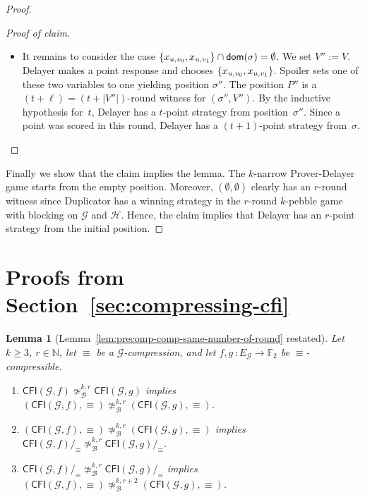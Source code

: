 \documentclass[10pt,a4paper]{article}
\DeclarePairedDelimiter\set{\lbrace}{\rbrace}
\newcommand{\comp}{\equiv}
\newcommand{\CFIsym}{\mathsf{CFI}}
\newcommand{\CFI}[1]{\CFIsym(#1)}
\newcommand{\compCFI}[2]{\CFI{#1}/_{#2}}
\newcommand{\precompCFI}[2]{{(\CFI{#1},#2)}}
\newcommand{\nat}{\mathbb{N}}
\newcommand{\FF}{\mathbb{F}}
\newcommand{\graphG}{\mathcal{G}}
\newcommand{\graphH}{\mathcal{H}}
\newcommand{\edgeG}{E_{\graphG}}
\newcommand{\dom}{\mathsf{dom}}
\newcommand{\notkbequivr}[2]{\not\simeq_{\mathcal{B}}^{#1,#2}}
\newtheorem{lemma}[theorem]{Lemma}
\newenvironment{claimproof}{\begin{proof}[Proof of claim]}{\end{proof}}
\newcommand{\claimqedhere}{\qedhere}
\begin{document}
\begin{proof}
\begin{claimproof}
\begin{itemize}
        Hence, we may assume that this case does not occur.
        \item It remains to consider the case $\set{x_{u,v_0}, x_{u,v_1}} \cap \dom(\sigma) = \emptyset$.
        We set $V'' := V$.
        Delayer makes a point response and chooses $\set{x_{u,v_0}, x_{u,v_1}}$.
        Spoiler sets one of these two variables to one yielding position $\sigma''$.
        The position $P''$ is a $(t+\ell)=(t+|V''|)$-round witness for $(\sigma'',V'')$.
        By the inductive hypothesis for~$t$,
        Delayer has a $t$\nobreakdash-point strategy from position~$\sigma''$.
        Since a point was scored in this round,
        Delayer has a $(t+1)$\nobreakdash-point strategy from~$\sigma$. 
    	\claimqedhere
\end{itemize}
\end{claimproof}


Finally we show that the claim implies the lemma. The $k$-narrow Prover-Delayer game starts from the empty position. Moreover, $(\emptyset,\emptyset)$ clearly has an $r$-round witness since Duplicator has a winning strategy in the $r$-round $k$-pebble game with blocking on $\graphG$ and $\graphH$. Hence, the claim implies that Delayer has an $r$-point strategy from the initial position.
\end{proof} 
\section{Proofs from Section~\ref{sec:compressing-cfi}} \label{a: compress}

\begin{lemma}[Lemma~\ref{lem:precomp-comp-same-number-of-round} restated]
        Let $k\geq 3$, $r\in\nat$, let $\comp$ be a $\graphG$-compression, and
        let $f,g \, \colon \edgeG \to \FF_2$ be $\comp$\nobreakdash-compressible.
        \begin{enumerate}
                \item $\CFI{\graphG,f} \notkbequivr{k}{r} \CFI{\graphG,g}$
                implies $\precompCFI{\graphG,f}{\comp} \notkbequivr{k}{r} \precompCFI{\graphG,g}{\comp}$.
                \item  $\precompCFI{\graphG,f}{\comp} \notkbequivr{k}{r} \precompCFI{\graphG,g}{\comp}$
                implies $\compCFI{\graphG,f}{\comp} \notkbequivr{k}{r} \compCFI{\graphG,g}{\comp}$.
                \item $\compCFI{\graphG,f}{\comp} \notkbequivr{k}{r} \compCFI{\graphG,g}{\comp}$ implies
                $\precompCFI{\graphG,f}{\comp} \notkbequivr{k}{r+2} \precompCFI{\graphG,g}{\comp}$.
        \end{enumerate}
\end{lemma}
\end{document}

